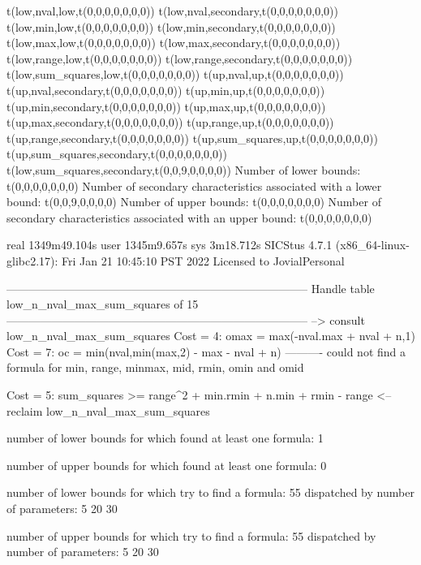 t(low,nval,low,t(0,0,0,0,0,0,0))
t(low,nval,secondary,t(0,0,0,0,0,0,0))
t(low,min,low,t(0,0,0,0,0,0,0))
t(low,min,secondary,t(0,0,0,0,0,0,0))
t(low,max,low,t(0,0,0,0,0,0,0))
t(low,max,secondary,t(0,0,0,0,0,0,0))
t(low,range,low,t(0,0,0,0,0,0,0))
t(low,range,secondary,t(0,0,0,0,0,0,0))
t(low,sum_squares,low,t(0,0,0,0,0,0,0))
t(up,nval,up,t(0,0,0,0,0,0,0))
t(up,nval,secondary,t(0,0,0,0,0,0,0))
t(up,min,up,t(0,0,0,0,0,0,0))
t(up,min,secondary,t(0,0,0,0,0,0,0))
t(up,max,up,t(0,0,0,0,0,0,0))
t(up,max,secondary,t(0,0,0,0,0,0,0))
t(up,range,up,t(0,0,0,0,0,0,0))
t(up,range,secondary,t(0,0,0,0,0,0,0))
t(up,sum_squares,up,t(0,0,0,0,0,0,0))
t(up,sum_squares,secondary,t(0,0,0,0,0,0,0))
t(low,sum_squares,secondary,t(0,0,9,0,0,0,0))
Number of lower bounds:                                             t(0,0,0,0,0,0,0)
Number of secondary characteristics associated with a lower bound:  t(0,0,9,0,0,0,0)
Number of upper bounds:                                             t(0,0,0,0,0,0,0)
Number of secondary characteristics associated with an upper bound: t(0,0,0,0,0,0,0)

real	1349m49.104s
user	1345m9.657s
sys	3m18.712s
SICStus 4.7.1 (x86_64-linux-glibc2.17): Fri Jan 21 10:45:10 PST 2022
Licensed to JovialPersonal


--------------------------------------------------------------------------------
Handle table low_n_nval_max_sum_squares of 15
--------------------------------------------------------------------------------
--> consult low_n_nval_max_sum_squares
Cost =  4:  omax   = max(-nval.max + nval + n,1)
Cost =  7:  oc     = min(nval,min(max,2) - max - nval + n)
----------
could not find a formula for min, range, minmax, mid, rmin, omin and omid

Cost =  5:  sum_squares >= range^2 + min.rmin + n.min + rmin - range
<-- reclaim low_n_nval_max_sum_squares

number of lower bounds for which found at least one formula: 1

number of upper bounds for which found at least one formula: 0

number of lower bounds for which try to find a formula: 55
dispatched by number of parameters: 5  20  30

number of upper bounds for which try to find a formula: 55
dispatched by number of parameters: 5  20  30

